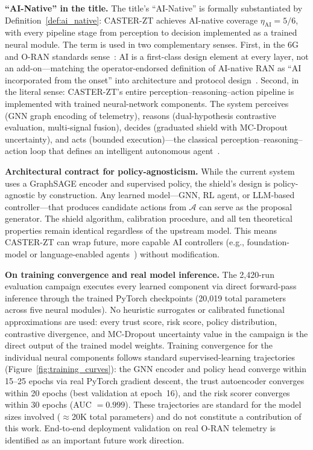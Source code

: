 \documentclass[10pt,journal,compsoc]{IEEEtran}
\begin{document}
\noindent\textbf{``AI-Native'' in the title.}
The title's ``AI-Native'' is formally substantiated by Definition~\ref{def:ai_native}: CASTER-ZT achieves AI-native coverage $\eta_{\mathrm{AI}} = 5/6$, with every pipeline stage from perception to decision implemented as a trained neural module.
The term is used in two complementary senses.
First, in the 6G and O-RAN standards sense~\cite{polese2025ainative,zhang2025ainative6g,saad2020vision6g,oran_official_architecture}: AI is a first-class design element at every layer, not an add-on---matching the operator-endorsed definition of AI-native RAN as ``AI incorporated from the onset'' into architecture and protocol design~\cite{polese2025ainative}.
Second, in the literal sense: CASTER-ZT's entire perception--reasoning--action pipeline is implemented with trained neural-network components.
The system perceives (GNN graph encoding of telemetry), reasons (dual-hypothesis contrastive evaluation, multi-signal fusion), decides (graduated shield with MC-Dropout uncertainty), and acts (bounded execution)---the classical perception--reasoning--action loop that defines an intelligent autonomous agent~\cite{amodei2016concrete}.

\noindent\textbf{Architectural contract for policy-agnosticism.}
While the current system uses a GraphSAGE encoder and supervised policy, the shield's design is policy-agnostic by construction.
Any learned model---GNN, RL agent, or LLM-based controller---that produces candidate actions from $\mathcal{A}$ can serve as the proposal generator.
The shield algorithm, calibration procedure, and all ten theoretical properties remain identical regardless of the upstream model.
This means CASTER-ZT can wrap future, more capable AI controllers (e.g., foundation-model or language-enabled agents~\cite{toward_autonomous_oran_2026,lee2024llmran}) without modification.

\noindent\textbf{On training convergence and real model inference.}
The 2,420-run evaluation campaign executes every learned component via direct forward-pass inference through the trained PyTorch checkpoints (20,019 total parameters across five neural modules).
No heuristic surrogates or calibrated functional approximations are used: every trust score, risk score, policy distribution, contrastive divergence, and MC-Dropout uncertainty value in the campaign is the direct output of the trained model weights.
Training convergence for the individual neural components follows standard supervised-learning trajectories (Figure~\ref{fig:training_curves}): the GNN encoder and policy head converge within 15--25 epochs via real PyTorch gradient descent, the trust autoencoder converges within 20 epochs (best validation at epoch~16), and the risk scorer converges within 30 epochs (AUC $= 0.999$).
These trajectories are standard for the model sizes involved ($\approx$20K total parameters) and do not constitute a contribution of this work.
End-to-end deployment validation on real O-RAN telemetry is identified as an important future work direction.
\end{document}
